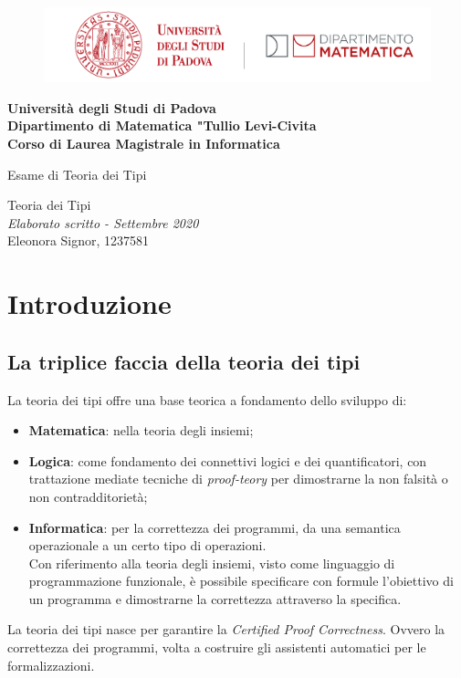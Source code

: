 \documentclass[10pt,a4paper, italian]{book}
\begin{document}
\begin{figure}[H]
\centering
  \includegraphics[width=0.6\linewidth]{./img/logo_dip.png}
   \label{fig: logo-unip-dipartimento-matematica}
\end{figure}
\begin{center}\Large{\textbf{Universit\`a degli Studi di Padova\\Dipartimento di Matematica "Tullio Levi-Civita\\Corso di Laurea Magistrale in Informatica}}\end{center}
\begin{center}\Large{Esame di Teoria dei Tipi}\end{center}
\begin{flushright} 
Teoria dei Tipi\\
\textit{Elaborato scritto - Settembre 2020}\\
Eleonora Signor, 1237581
\end{flushright}


\pagebreak

\tableofcontents \pagebreak

\chapter{Introduzione}
\label{cap:introduzione}
\section{La triplice faccia della teoria dei tipi}
\label{sec:la-triplice-faccia}
La teoria dei tipi offre una base teorica a fondamento dello sviluppo di:
\begin{itemize}
\item \textbf{Matematica}: nella teoria degli insiemi;
\item \textbf{Logica}: come fondamento dei connettivi logici e dei quantificatori, con trattazione mediate tecniche di \textit{proof-teory} per dimostrarne la non falsit\`a o non contradditoriet\`a;
\item \textbf{Informatica}: per la correttezza dei programmi, da una semantica operazionale a un certo tipo di operazioni.\\ 
Con riferimento alla teoria degli insiemi, visto come linguaggio di programmazione funzionale, \`e possibile specificare con formule l'obiettivo di un programma e dimostrarne la correttezza attraverso la specifica.
\end{itemize}
\noindent
La teoria dei tipi nasce per garantire la \textit{Certified Proof Correctness}. Ovvero la correttezza dei programmi, volta a costruire gli assistenti automatici per le formalizzazioni.
\end{document}
